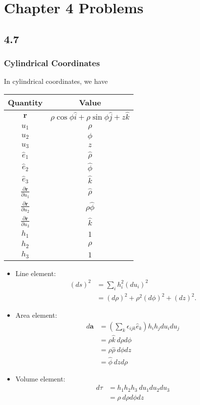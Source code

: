 \documentclass[10pt]{mypackage}
\begin{document}
\RaggedRight

\section{Chapter 4 Problems}%
\subsection{4.7}%
\subsubsection{Cylindrical Coordinates}%
In cylindrical coordinates, we have
\begin{center}
  \renewcommand{\arraystretch}{1.5}
  \begin{tabular}{c|c}
    Quantity & Value\\
    \hline \hline
    $\mathbf{r}$ & $\rho\cos\phi\hat{i} + \rho\sin\phi\hat{j} + z\hat{k}$\\
    \hline
    $u_1$ & $\rho$\\
    $u_2$ & $\phi$\\
    $u_3$ & $z$\\
    \hline
    $\hat{e}_1$ & $\hat{\rho}$\\
    $\hat{e}_2$ & $\hat\phi$\\
    $\hat{e}_3$ & $\hat{k}$\\
    \hline
    $\frac{\partial \mathbf{r}}{\partial u_1}$ & $\hat\rho$\\
    $\frac{\partial \mathbf{r}}{\partial u_2}$ & $\rho\hat\phi$\\
    $\frac{\partial \mathbf{r}}{\partial u_3}$ & $\hat k$\\
    \hline
    $h_1$ & $1$\\
    $h_2$ & $\rho$\\
    $h_3$ & $1$
  \end{tabular}
\end{center}
\begin{itemize}
  \item Line element:
    \begin{align*}
      \left(ds\right)^2 &= \sum_{i}h_i^2 \left(du_i\right)^2\\
                        &= \left(d\rho\right)^2 + \rho^2\left(d\phi\right)^2 + \left(dz\right)^2.
    \end{align*}
  \item Area element:
    \begin{align*}
      d\mathbf{a} &= \left(\sum_{k}\epsilon_{ijk}\hat{e}_k\right)h_ih_jdu_i du_j\\
                  &= \rho\hat{k}\: d\rho d\phi\\
                  &= \rho\hat{\rho}\: d\phi dz\\
                  &= \hat{\phi}\: dz d\rho
    \end{align*}
  \item Volume element:
    \begin{align*}
      d\tau &= h_1h_2h_3\: du_1 du_2 du_3\\
            &= \rho\: d\rho d\phi dz
    \end{align*}
\end{itemize}
\end{document}
